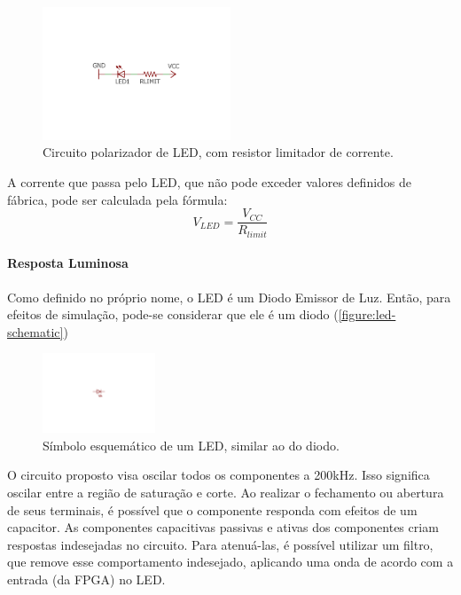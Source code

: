 	\begin{figure}[htb]
		\caption{\label{figure:led-circuit}Circuito polarizador de LED, com resistor limitador de corrente.}
		\centering
		\includegraphics[width=0.5\textwidth, trim={8cm 8cm 8cm 8.5cm},clip]{circuits/led_circuit.pdf}
	\end{figure}

	A corrente que passa pelo LED, que não pode exceder valores definidos de fábrica, pode ser calculada pela fórmula:
	\begin{equation}
	V_{LED} = \frac{V_{CC}}{R_{limit}}
	\end{equation}
	
	\paragraph{Resposta Luminosa}
	
	Como definido no próprio nome, o LED é um Diodo Emissor de Luz. Então, para efeitos de simulação, pode-se considerar que ele é um diodo (\autoref{figure:led-schematic})
	\begin{figure}[h]
		\caption{\label{figure:led-schematic}Símbolo esquemático de um LED, similar ao do diodo.}
		\centering
		\includegraphics[width=0.3\textwidth, trim={12cm 9.2cm 12cm 9.5cm},clip]{circuits/led_schematics.pdf}
	\end{figure}
	O circuito proposto visa oscilar todos os componentes a 200kHz. Isso significa oscilar entre a região de saturação e corte. Ao realizar o fechamento ou abertura de seus terminais, é possível que o componente responda com efeitos de um capacitor. As componentes capacitivas passivas e ativas dos componentes criam respostas indesejadas no circuito. Para atenuá-las, é possível utilizar um filtro, que remove esse comportamento indesejado, aplicando uma onda de acordo com a entrada (da FPGA) no LED.
	
